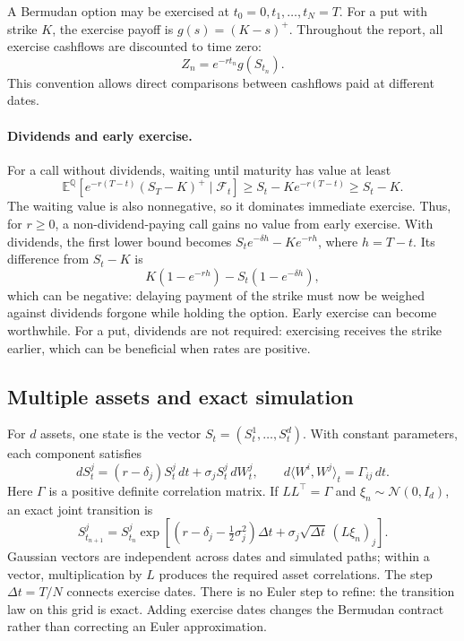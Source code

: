\documentclass[11pt,a4paper]{article}
\newcommand{\E}{\mathbb E^{\mathbb Q}}
\begin{document}
A Bermudan option may be exercised at $t_0=0,t_1,\ldots,t_N=T$.
For a put with strike $K$, the exercise payoff is $g(s)=(K-s)^+$.
Throughout the report, all exercise cashflows are discounted to time zero:
\begin{equation}\label{eq:discount}
 Z_n=e^{-rt_n}g(S_{t_n}).
\end{equation}
This convention allows direct comparisons between cashflows paid at different dates.

\paragraph{Dividends and early exercise.}
For a call without dividends, waiting until maturity has value at least
\[
 \E[e^{-r(T-t)}(S_T-K)^+\mid\mathcal F_t]
 \geq S_t-Ke^{-r(T-t)}\geq S_t-K.
\]
The waiting value is also nonnegative, so it dominates immediate exercise.
Thus, for $r\geq0$, a non-dividend-paying call gains no value from early exercise.
With dividends, the first lower bound becomes $S_te^{-\delta h}-Ke^{-rh}$,
where $h=T-t$. Its difference from $S_t-K$ is
\[
 K(1-e^{-rh})-S_t(1-e^{-\delta h}),
\]
which can be negative: delaying payment of the strike must now be weighed against
dividends forgone while holding the option. Early exercise can become worthwhile.
For a put, dividends are not required: exercising receives the strike earlier,
which can be beneficial when rates are positive.

\subsection{Multiple assets and exact simulation}
For $d$ assets, one state is the vector $S_t=(S_t^1,\ldots,S_t^d)$.
With constant parameters, each component satisfies
\[
 dS_t^j=(r-\delta_j)S_t^j\,dt+\sigma_jS_t^j\,dW_t^j,
 \qquad d\langle W^i,W^j\rangle_t=\Gamma_{ij}\,dt.
\]
Here $\Gamma$ is a positive definite correlation matrix. If $LL^\top=\Gamma$
and $\xi_n\sim\mathcal N(0,I_d)$, an exact joint transition is
\begin{equation}
 S_{t_{n+1}}^j=S_{t_n}^j\exp\!\left[
 (r-\delta_j-\tfrac12\sigma_j^2)\Delta t
 +\sigma_j\sqrt{\Delta t}\,(L\xi_n)_j\right].
\end{equation}
Gaussian vectors are independent across dates and simulated paths; within a
vector, multiplication by $L$ produces the required asset correlations.
The step $\Delta t=T/N$ connects exercise dates. There is no Euler step to refine:
the transition law on this grid is exact. Adding exercise dates changes the
Bermudan contract rather than correcting an Euler approximation.
\end{document}
